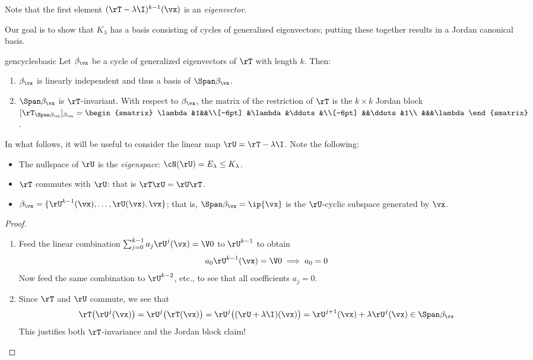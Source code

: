 Note that the first element $(\rT-\lambda\I)^{k-1}(\vx)$ is an \emph{eigenvector}.

Our goal is to show that $K_\lambda$ has a basis consisting of cycles of generalized eigenvectors; putting these together results in a Jordan canonical basis.

\begin{lemm}{}{gencyclesbasic}
Let $\beta_\vx$ be a cycle of generalized eigenvectors of $\rT$ with length $k$. Then:
\begin{enumerate}%
  \item $\beta_\vx$ is linearly independent and thus a basis of $\Span\beta_\vx$.
  \item $\Span\beta_\vx$ is $\rT$-invariant. With respect to $\beta_\vx$, the matrix of the restriction of $\rT$ is the $k\times k$ Jordan block $[\rT_{\Span\beta_\vx}]_{\beta_\vx}=\begin{smatrix}
  \lambda&1&&\\[-6pt]
  &\lambda&\ddots&\\[-6pt]
  &&\ddots&1\\
  &&&\lambda
  \end{smatrix}$.
\end{enumerate}
\end{lemm}

In what follows, it will be useful to consider the linear map $\rU=\rT-\lambda\I$. Note the following:
\begin{itemize}%
  \item The nullspace of $\rU$ is the \emph{eigenspace}: $\cN(\rU)=E_\lambda\le K_\lambda$.
  \item $\rT$ commutes with $\rU$: that is $\rT\rU=\rU\rT$.
  \item $\beta_\vx=\{\rU^{k-1}(\vx),\ldots,\rU(\vx),\vx\}$; that is, $\Span\beta_\vx=\ip{\vx}$ is the $\rU$-cyclic subspace generated by $\vx$.
\end{itemize}

\begin{proof}
\begin{enumerate}%
  \item Feed the linear combination $\sum_{j=0}^{k-1}a_j\rU^j(\vx)=\V0$ to $\rU^{k-1}$ to obtain
  \[a_0\rU^{k-1}(\vx)=\V0\implies a_0=0\]
  Now feed the same combination to $\rU^{k-2}$, etc., to see that all coefficients $a_j=0$.
  \item Since $\rT$ and $\rU$ commute, we see that
  \[\rT\bigl(\rU^j(\vx)\bigr)=\rU^j\bigl(\rT(\vx)\bigr)=\rU^j\bigl((\rU+\lambda\I)(\vx)\bigr)=\rU^{j+1}(\vx)+\lambda\rU^j(\vx)\in\Span\beta_\vx\]
  This justifies both $\rT$-invariance and the Jordan block claim!\qedhere
\end{enumerate}
\end{proof}

